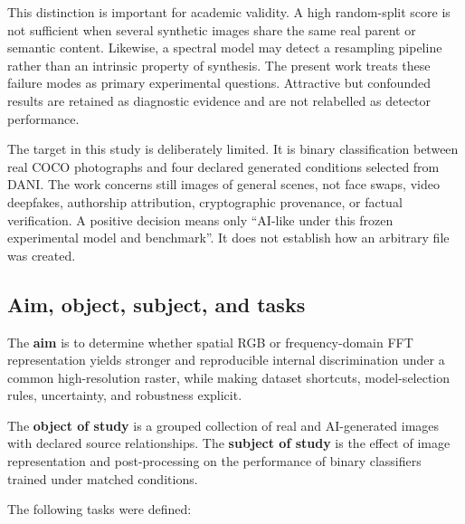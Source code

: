 \documentclass[12pt,a4paper]{article}
\begin{document}
This distinction is important for academic validity. A high random-split score is not sufficient
when several synthetic images share the same real parent or semantic content. Likewise, a spectral
model may detect a resampling pipeline rather than an intrinsic property of synthesis. The present
work treats these failure modes as primary experimental questions. Attractive but confounded
results are retained as diagnostic evidence and are not relabelled as detector performance.

The target in this study is deliberately limited. It is binary classification between real COCO
photographs and four declared generated conditions selected from DANI. The work concerns still
images of general scenes, not face swaps, video deepfakes, authorship attribution, cryptographic
provenance, or factual verification. A positive decision means only ``AI-like under this frozen
experimental model and benchmark''. It does not establish how an arbitrary file was created.

\subsection{Aim, object, subject, and tasks}

The \textbf{aim} is to determine whether spatial RGB or frequency-domain FFT representation yields
stronger and reproducible internal discrimination under a common high-resolution raster, while
making dataset shortcuts, model-selection rules, uncertainty, and robustness explicit.

The \textbf{object of study} is a grouped collection of real and AI-generated images with declared
source relationships. The \textbf{subject of study} is the effect of image representation and
post-processing on the performance of binary classifiers trained under matched conditions.

The following tasks were defined:
\end{document}
